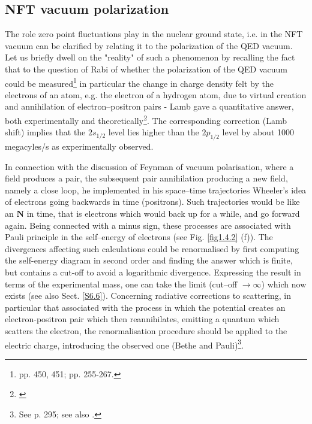 \begin{subappendices}
 \section{NFT vacuum polarization}\label{App1.E}
 The role zero point fluctuations play in the nuclear ground state, i.e. in the NFT vacuum  can
 be  clarified by relating it to the polarization of the QED vacuum.
 Let us briefly dwell on the "reality" of such a phenomenon by recalling the fact that
 to the question of Rabi of whether the polarization of the QED vacuum could be measured\footnote{\cite{Pais:86} pp. 450, 451; \cite{Pais:00} pp. 255-267.} in particular
 the change in charge  density felt by the electrons of an atom,  e.g. the electron of a hydrogen atom, due to
 virtual creation and annihilation of electron--positron pairs - Lamb gave a quantitative answer, both experimentally
 and theoretically\footnote{\cite{Lamb:47,Kroll:49}}. The corresponding correction  (Lamb shift) implies that the $2s_{1/2}$ level lies 
 higher than the $2p_{1/2}$ level by about 1000 megacyles/s  as experimentally observed.
 
 In connection with the discussion of Feynman of vacuum polarisation, where a field produces a pair,
 the subsequent pair annihilation producing a new field, namely a close loop, he implemented in his space--time trajectories 
 Wheeler's idea of electrons going backwards in time (positrons).  Such trajectories would be like an $\mathbf N$ in time,
 that is electrons which would back up for a while, and go forward again. Being connected 
 with a minus sign, these processes are associated with Pauli principle in the self--energy of electrons
 (see Fig. \ref{fig1.4.2} (f)). 
 The divergences affecting
 such calculations  could be renormalised by first computing the self-energy  diagram in second order and finding the answer which is finite, but contains a cut-off
 to avoid a logarithmic divergence. Expressing the result in terms of the experimental mass, one can take 
 the limit (cut--off $\to \infty$) which now exists (see also Sect. \ref{S6.6}).
 Concerning radiative corrections to scattering, in particular that associated with the process
 in which the potential creates an electron-positron pair which then reannihilates, emitting a quantum which scatters the
 electron, the renormalisation procedure should be applied to the electric charge, introducing 
 the observed one (Bethe and Pauli)\footnote{See \cite{Mehra:96} p. 295; see also \cite{Bjorken:98}.}.
 

\end{subappendices}
